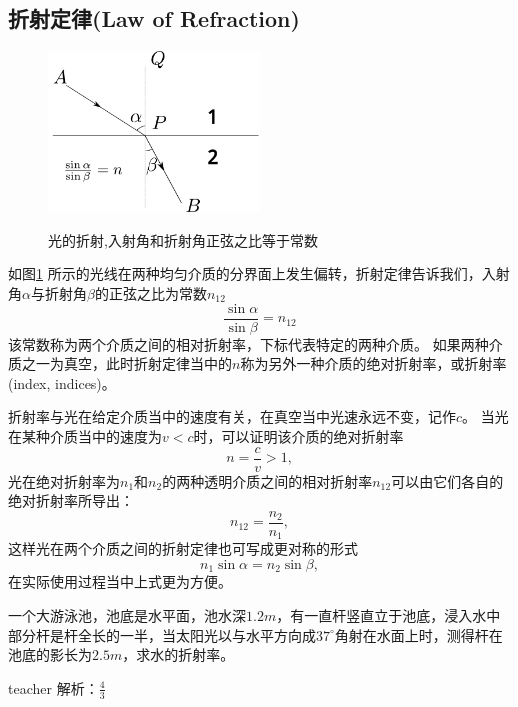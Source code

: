 \subsection{折射定律(Law of Refraction)}
\begin{figure}[hbtp]
\begin{center}
\includegraphics[width=0.5\textwidth]{images/refraction.pdf}
\label{fig: geo-refraction}
\caption{光的折射,入射角和折射角正弦之比等于常数}
\end{center}
\end{figure}

如图\ref{fig: geo-refraction} 所示的光线在两种均匀介质的分界面上发生偏转，折射定律告诉我们，入射角$\alpha$与折射角$\beta$的正弦之比为常数$n_{12}$
\begin{equation}\label{eqn: geo-refraction law}
\frac{\sin\alpha}{\sin\beta}=n_{12}
\end{equation}
该常数称为两个介质之间的相对折射率，下标代表特定的两种介质。
如果两种介质之一为真空，此时折射定律当中的$n$称为另外一种介质的{\heiti 绝对折射率}，或{\heiti 折射率}(index, indices)。

折射率与光在给定介质当中的速度有关，在真空当中光速永远不变，记作$c$。
当光在某种介质当中的速度为$v<c$时，可以证明该介质的绝对折射率
\begin{equation}
n=\frac{c}{v}>1,
\end{equation}
光在绝对折射率为$n_1$和$n_2$的两种透明介质之间的相对折射率$n_{12}$可以由它们各自的绝对折射率所导出：
\begin{equation}
n_{12} = \frac{n_2}{n_1},
\end{equation}
这样光在两个介质之间的折射定律也可写成更对称的形式
\begin{equation}
n_1\sin\alpha = n_2\sin\beta,
\end{equation}
在实际使用过程当中上式更为方便。

\begin{example}
一个大游泳池，池底是水平面，池水深$ 1.2\si{m}$，有一直杆竖直立于池底，浸入水中部分杆是杆全长的一半，当太阳光以与水平方向成$ 37^\circ$角射在水面上时，测得杆在池底的影长为$ 2.5\si{m}$，求水的折射率。
\begin{taggedblock}{teacher}
\newline
解析：$\frac{4}{3}$
\end{taggedblock}
\end{example}


